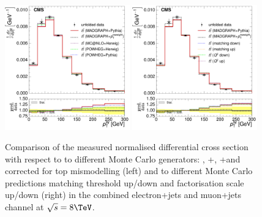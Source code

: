 \begin{figure}[hbtp]
    \centering
     \includegraphics[width=0.48\textwidth]{Chapters/04_Analysis/04b_XSections/images/results/8TeV/WPT/central/normalised_xsection_combined_different_generators.pdf}\hfill
     \includegraphics[width=0.48\textwidth]{Chapters/04_Analysis/04b_XSections/images/results/8TeV/WPT/central/normalised_xsection_combined_systematics_shifts.pdf}\hfill
     \caption{Comparison of the measured normalised differential cross section with respect to \wpt to
     different Monte Carlo generators: \MADGRAPH, \POWHEG+\HERWIG, \POWHEG+\PYTHIA and \MADGRAPH corrected for
     top \pt mismodelling (left) and to different Monte Carlo predictions matching threshold up/down and
     factorisation scale up/down (right) in the combined electron+jets and muon+jets channel at
     $\sqrt{s}=8\TeV$.}
     \label{fig:result_MT_8TeV_combined}
\end{figure}

